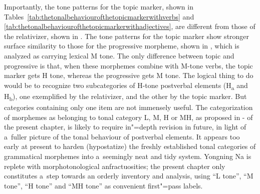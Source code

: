 Importantly, the tone patterns for the topic marker, shown in Tables~\ref{tab:thetonalbehaviourofthetopicmarkerwithverbs} and \ref{tab:thetonalbehaviourofthetopicmarkerwithadjectives}, are different from those of the {relativizer}, shown in . The tone patterns for the topic marker show stronger surface similarity to those for the {progressive} morpheme, shown in , which is analyzed as carrying lexical M tone. The only difference between {topic} and {progressive} is that, when these morphemes combine with M-tone verbs, the {topic} marker gets H tone, whereas the {progressive} gets M tone. The logical thing to do would be to recognize two subcategories of H-tone postverbal elements (H\textsubscript{a} and H\textsubscript{b}), one exemplified by the {relativizer}, and the other by the {topic} marker. But categories containing only one item are not immensely useful. The categorization of morphemes as belonging to tonal category L, M, H or MH, as proposed in - of the present chapter, is likely to require in"=depth revision in future, in light of a~fuller picture of the tonal behaviour of postverbal elements. It appears too early at present to harden (hypostatize) the freshly established tonal categories of grammatical morphemes into a~seemingly neat and tidy system. Yongning Na is replete with morphotonological anfractuosities; the present chapter only constitutes a~step towards an orderly inventory and analysis, using “L tone”, “M tone”, “H tone” and “MH tone” as convenient first"=pass labels.

